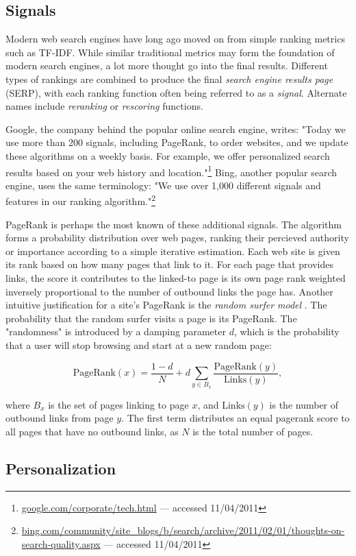 \subsection{Signals}

Modern web search engines have long ago moved on from simple ranking metrics such as TF-IDF.
While similar traditional metrics may form the foundation of modern search engines, a lot more thought go into the final results.
Different types of rankings are combined to produce the final \emph{search engine results page} (SERP),
with each ranking function often being referred to as a \emph{signal}. Alternate names include
\emph{reranking} or \emph{rescoring} functions.

Google, the company behind the popular online search engine, writes: "Today we use more than 200 signals, including PageRank, 
to order websites, and we update these algorithms on a weekly basis. 
For example, we offer personalized search results based on your web history and 
location."\footnote{\url{google.com/corporate/tech.html} --- accessed 11/04/2011}
Bing, another popular search engine, uses the same terminology:
"We use over 1,000 different signals and features in our ranking 
algorithm."\footnote{\url{bing.com/community/site_blogs/b/search/archive/2011/02/01/thoughts-on-search-quality.aspx} --- accessed 11/04/2011}

PageRank \cite[p4]{Bender2005} is perhaps the most known of these additional signals.
The algorithm forms a probability distribution over web pages, ranking their percieved
authority or importance according to a simple iterative estimation.
Each web site is given its rank based on how many pages that link to it.
For each page that provides links, the score it contributes to the linked-to page is 
its own page rank weighted inversely proportional to the number of outbound links the page has.
Another intuitive justification for a site's PageRank is the \emph{random surfer model} \cite[p4]{Bender2005}.
The probability that the random surfer visits a page is its PageRank. The "randomness" is introduced 
by a damping parameter $d$, which is the probability that a user will stop browsing and start at a new random page:

\begin{equation*}
  \mathrm{PageRank}(x) = \frac{1 - d}{N} + d \sum_{y \in B_x} \frac{\mathrm{PageRank}(y)}{\mathrm{Links}(y)},
\end{equation*}

where $B_x$ is the set of pages linking to page $x$, and $\mathrm{Links}(y)$ is the number of outbound links from page $y$.
The first term distributes an equal pagerank score to all pages that have no outbound links, as $N$ is the total number of pages.




\subsection{Personalization}
